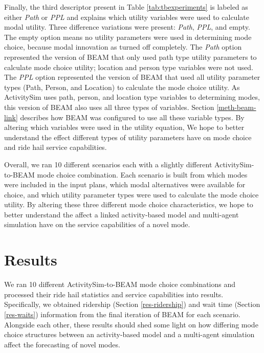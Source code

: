 \documentclass[12pt, oneside, openright]{byuthesis}
\begin{document}
Finally, the third descriptor present in Table \ref{tab:tbexperiments} is labeled as either \emph{Path} or \emph{PPL} and explains which utility variables were used to calculate modal utility. Three difference variations were present: \emph{Path}, \emph{PPL}, and empty. The empty option means no utility parameters were used in determining mode choice, because modal innovation as turned off completely. The \emph{Path} option represented the version of BEAM that only used path type utility parameters to calculate mode choice utility; location and person type variables were not used. The \emph{PPL} option represented the version of BEAM that used all utility parameter types (Path, Person, and Location) to calculate the mode choice utility. As ActivitySim uses path, person, and location type variables to determining modes, this version of BEAM also uses all three types of variables. Section \ref{meth-beam-link} describes how BEAM was configured to use all these variable types. By altering which variables were used in the utility equation, We hope to better understand the effect different types of utility parameters have on mode choice and ride hail service capabilities.

Overall, we ran 10 different scenarios each with a slightly different ActivitySim-to-BEAM mode choice combination. Each scenario is built from which modes were included in the input plans, which modal alternatives were available for choice, and which utility parameter types were used to calculate the mode choice utility. By altering these three different mode choice characteristics, we hope to better understand the affect a linked activity-based model and multi-agent simulation have on the service capabilities of a novel mode.

\hypertarget{results}{%
\chapter{Results}\label{results}}

We ran 10 different ActivitySim-to-BEAM mode choice combinations and processed their ride hail statistics and service capabilities into results. Specifically, we obtained ridership (Section \ref{res-ridership}) and wait time (Section \ref{res-waits}) information from the final iteration of BEAM for each scenario. Alongside each other, these results should shed some light on how differing mode choice structures between an activity-based model and a multi-agent simulation affect the forecasting of novel modes.
\end{document}
